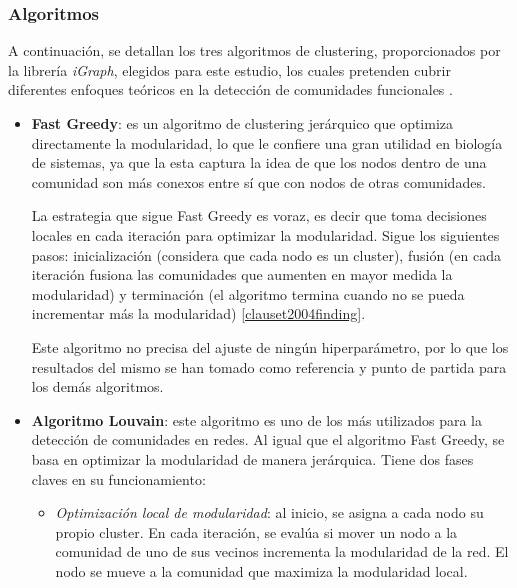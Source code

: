 \subsubsection{Algoritmos}
\label{sec:algoritmos}

A continuación, se detallan los tres algoritmos de clustering, proporcionados por la librería \textit{iGraph}, elegidos para este estudio, los cuales pretenden cubrir diferentes enfoques teóricos en la detección de comunidades funcionales \cite{igraph}.  

\begin{itemize}
    \item \textbf{Fast Greedy}: es un algoritmo de clustering jerárquico que optimiza directamente la modularidad, lo que le confiere una gran utilidad en biología de sistemas, ya que la esta captura la idea de que los nodos dentro de una comunidad son más conexos entre sí que con nodos de otras comunidades.
    
    La estrategia que sigue Fast Greedy es voraz, es decir que toma decisiones locales en cada iteración para optimizar la modularidad. Sigue los siguientes pasos: inicialización (considera que cada nodo es un cluster), fusión (en cada iteración fusiona las comunidades que aumenten en mayor medida la modularidad) y terminación (el algoritmo termina cuando no se pueda incrementar más la modularidad) \ref{clauset2004finding}.

    Este algoritmo no precisa del ajuste de ningún hiperparámetro, por lo que los resultados del mismo se han tomado como referencia y punto de partida para los demás algoritmos.
    
    
    \item \textbf{Algoritmo Louvain}: este algoritmo es uno de los más utilizados para la detección de comunidades en redes. Al igual que el algoritmo Fast Greedy, se basa en optimizar la modularidad de manera jerárquica. Tiene dos fases claves en su funcionamiento:

    \begin{itemize}
        \item \textit{Optimización local de modularidad}: al inicio, se asigna a cada nodo su propio cluster. En cada iteración, se evalúa si mover un nodo a la comunidad de uno de sus vecinos incrementa la modularidad de la red. El nodo se mueve a la comunidad que maximiza la modularidad local.


\end{itemize}
\end{itemize}
